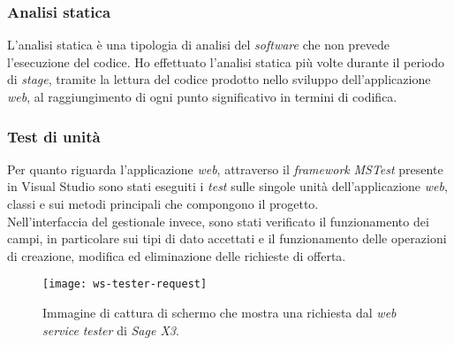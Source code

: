\subsubsection{Analisi statica}
L'analisi statica è una tipologia di analisi del \textit{software} che non prevede l'esecuzione del codice.
Ho effettuato l'analisi statica più volte durante il periodo di \textit{stage}, tramite la lettura del codice prodotto nello sviluppo dell'applicazione \textit{web}, al raggiungimento di ogni punto significativo in termini di codifica.

\subsubsection{Test di unità}
Per quanto riguarda l'applicazione \textit{web}, attraverso il \textit{framework} \textit{MSTest} presente in Visual Studio sono stati eseguiti i \textit{test} sulle singole unità dell'applicazione \textit{web}, classi e sui metodi principali che compongono il progetto.\\
Nell'interfaccia del gestionale invece, sono stati verificato il funzionamento dei campi, in particolare sui tipi di dato accettati e il funzionamento delle operazioni di creazione, modifica ed eliminazione delle richieste di offerta.


\vspace{20pt}

\begin{figure}[htbp]
	\begin{center}
		\texttt{[image: ws-tester-request]}
		\caption{Immagine di cattura di schermo che mostra una richiesta dal \textit{web service} \textit{tester} di \textit{Sage X3}.}
		\label{fig:request-ws}
	\end{center}
\end{figure}


